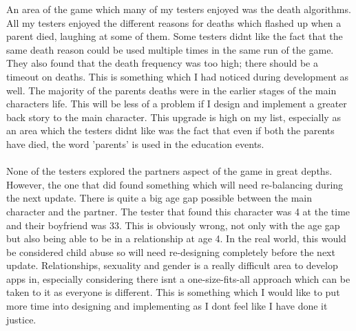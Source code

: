 An area of the game which many of my testers enjoyed was the death algorithms. All my testers enjoyed the different reasons for deaths which flashed up when a parent died, laughing at some of them. Some testers didn\textquotesingle t like the fact that the same death reason could be used multiple times in the same run of the game. They also found that the death frequency was too high; there should be a timeout on deaths. This is something which I had noticed during development as well. The majority of the parents deaths were in the earlier stages of the main characters life. This will be less of a problem if I design and implement a greater back story to the main character. This upgrade is high on my list, especially as an area which the testers didn\textquotesingle t like was the fact that even if both the parents have died, the word 'parents' is used in the education events. \\ \\
None of the testers explored the partners aspect of the game in great depths. However, the one that did found something which will need re-balancing during the next update. There is quite a big age gap possible between the main character and the partner. The tester that found this character was 4 at the time and their boyfriend was 33. This is obviously wrong, not only with the age gap but also being able to be in a relationship at age 4. In the real world, this would be considered child abuse so will need re-designing completely before the next update. Relationships, sexuality and gender is a really difficult area to develop apps in, especially considering there isn\textquotesingle t a one-size-fits-all approach which can be taken to it as everyone is different. This is something which I would like to put more time into designing and implementing as I don\textquotesingle t feel like I have done it justice. 

